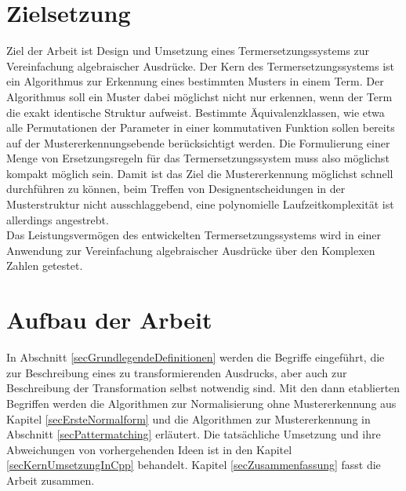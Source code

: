\section{Zielsetzung}
Ziel der Arbeit ist Design und Umsetzung eines Termersetzungssystems zur Vereinfachung algebraischer Ausdrücke. Der Kern des Termersetzungssystems ist ein Algorithmus zur Erkennung eines bestimmten Musters in einem Term. 
Der Algorithmus soll ein Muster dabei möglichst nicht nur erkennen, wenn der Term die exakt identische Struktur aufweist. Bestimmte Äquivalenzklassen, wie etwa alle Permutationen der Parameter in einer kommutativen Funktion sollen bereits auf der Mustererkennungsebende berücksichtigt werden. Die Formulierung einer Menge von Ersetzungsregeln für das Termersetzungssystem muss also möglichst kompakt möglich sein. 
Damit ist das Ziel die Mustererkennung möglichst schnell durchführen zu können, beim Treffen von Designentscheidungen in der Musterstruktur nicht ausschlaggebend, eine polynomielle Laufzeitkomplexität ist allerdings angestrebt.\\
Das Leistungsvermögen des entwickelten Termersetzungssystems wird in einer Anwendung zur Vereinfachung algebraischer Ausdrücke über den Komplexen Zahlen getestet. 

\section{Aufbau der Arbeit}
In Abschnitt \ref{secGrundlegendeDefinitionen} werden die Begriffe eingeführt, die zur Beschreibung eines zu transformierenden Ausdrucks, aber auch zur Beschreibung der Transformation selbst notwendig sind. Mit den dann etablierten Begriffen werden die Algorithmen zur Normalisierung ohne Mustererkennung aus Kapitel \ref{secErsteNormalform} und die Algorithmen zur Mustererkennung in Abschnitt \ref{secPattermatching} erläutert. 
Die tatsächliche Umsetzung und ihre Abweichungen von vorhergehenden Ideen ist in den Kapitel \ref{secKernUmsetzungInCpp} behandelt. 
Kapitel \ref{secZusammenfassung} fasst die Arbeit zusammen.



